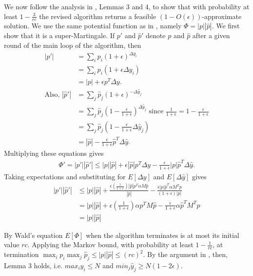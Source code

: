 \documentclass[11pt]{article}
\newcommand{\phat}{\hat{p}}
\newcommand{\yhat}{\hat{y}}
\newcommand{\sizeof}[1]{|#1|}
\newcommand{\epsDown}{\left( \frac{1}{1+\epsilon} \right) }
\begin{document}
We now follow the analysis in \cite{kouf2007}, Lemmas 3 and 4, to show that with
probability at least $1-\frac{3}{rc}$ the
revised algorithm returns a feasible $(1-O(\epsilon))$-approximate solution.
 We use the same potential function as in \cite{kouf2007}, namely 
$\Phi = \sizeof{p} \sizeof{\phat}$.  We first show that it is a
super-Martingale. If $p'$ and $\phat '$ denote $p$ and $\phat$ after a given
round of the main loop of the algorithm, then 
\begin{align*}
\sizeof{p '} &= \sum_i p_i(1+\epsilon)^{\Delta y_i} \\
 &= \sum_i p_i(1+\epsilon \Delta y_i) \\
 &= \sizeof{p} + \epsilon p ^T \Delta y.\\
\text{Also,  } \sizeof{\phat'} &= \sum_j \phat_j(1+\epsilon)^{-\Delta \yhat_j} 
\\ &= \sum_j \phat_j(1-\frac{\epsilon}{1+\epsilon})^{\Delta \yhat_j} 
\text{  since  }
\frac{1}{1+\epsilon} = 1 - \frac{\epsilon}{1+\epsilon} \\
 &=\sum_j \phat_j(1-\frac{\epsilon}{1+\epsilon} \Delta \yhat_j) \\
 &=\sizeof{\phat} - \frac{\epsilon}{1+\epsilon} \phat^T \Delta \yhat. 
\end{align*}
Multiplying these equations gives
\begin{align*}
\Phi ' = \sizeof{p'} \sizeof{\phat '} \leq \sizeof{p} \sizeof{\phat} + 
\epsilon \sizeof{\phat} p^T \Delta y - \frac{\epsilon}{1+\epsilon} 
\sizeof{p} \phat ^T \Delta \yhat.
\end{align*}
Taking expectations and substituting for $E[\Delta y]$ and $E[\Delta \yhat]$ 
gives
 \begin{align*}
\sizeof{p'} \sizeof{\phat '} &\leq \sizeof{p} \sizeof{\phat} + 
\frac{\epsilon \epsDown
\sizeof{\phat} p^T \alpha M \phat}{\sizeof{\phat}} - 
\frac{\epsilon \sizeof{p} \phat ^T \alpha M^T p}
{(1+\epsilon) \sizeof{p}}\\
&= \sizeof{p} \sizeof{\phat} + 
 \epsilon \epsDown \alpha  p^T  M \phat -
\frac{\epsilon}{1+\epsilon} \alpha \phat ^T  M^T p \\
&= \sizeof{p} \sizeof{\phat} 
\end{align*}

By Wald's equation $E[\Phi]$ when the algorithm terminates is at most its 
initial
value $rc$.  Applying the Markov bound, with probability at least
$1-\frac{1}{rc}$, at termination $\max_i p_i \max_j \phat _j \leq 
\sizeof{p} \sizeof{\phat} \leq (rc)^2$.  By the argument in \cite{kouf2007}, 
then, Lemma 3 holds, i.e. $max_i y_i \leq N$ and 
$min_j \yhat _j \geq N(1-2\epsilon)$. 
\end{document}
